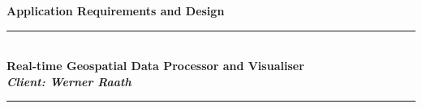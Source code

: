\documentclass[a4paper,12pt]{article}
\begin{document}
	
\begin{titlepage}
	\newcommand{\HRule}{\rule{\linewidth}{0.5mm}} %

	\center %
	 
	

	
	{ \huge \bfseries Application Requirements and Design}\\\HRule \\[0.4cm] %
	\Large \textbf{Real-time Geospatial Data Processor and Visualiser} \\
	\small \emph{\textbf{Client: Werner Raath}}
	\HRule \\[1.5cm]
	 

\end{titlepage}
\end{document}

